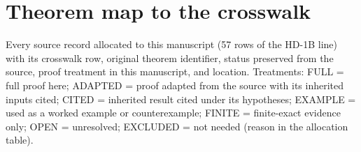 \section{Theorem map to the crosswalk}\label{app:map}
Every source record allocated to this manuscript (57 rows of the HD-1B line) with its crosswalk row, original theorem identifier, status preserved from the source, proof treatment in this manuscript, and location. Treatments: FULL = full proof here; ADAPTED = proof adapted from the source with its inherited inputs cited; CITED = inherited result cited under its hypotheses; EXAMPLE = used as a worked example or counterexample; FINITE = finite-exact evidence only; OPEN = unresolved; EXCLUDED = not needed (reason in the allocation table).

